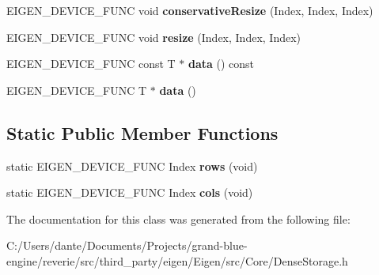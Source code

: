 \begin{DoxyCompactItemize}
\item 
\mbox{\label{class_eigen_1_1_dense_storage_aaca3c8de8c76bfc7f7c4856c0faae7b3}} 
E\+I\+G\+E\+N\+\_\+\+D\+E\+V\+I\+C\+E\+\_\+\+F\+U\+NC void {\bfseries conservative\+Resize} (Index, Index, Index)
\item 
\mbox{\label{class_eigen_1_1_dense_storage_a22518a835225a3464a2b12396f13a12c}} 
E\+I\+G\+E\+N\+\_\+\+D\+E\+V\+I\+C\+E\+\_\+\+F\+U\+NC void {\bfseries resize} (Index, Index, Index)
\item 
\mbox{\label{class_eigen_1_1_dense_storage_a5b5984857e0f9091125bc75acc6f770f}} 
E\+I\+G\+E\+N\+\_\+\+D\+E\+V\+I\+C\+E\+\_\+\+F\+U\+NC const T $\ast$ {\bfseries data} () const
\item 
\mbox{\label{class_eigen_1_1_dense_storage_a640d283f082751670f766a6f4ace1867}} 
E\+I\+G\+E\+N\+\_\+\+D\+E\+V\+I\+C\+E\+\_\+\+F\+U\+NC T $\ast$ {\bfseries data} ()
\end{DoxyCompactItemize}
\subsection*{Static Public Member Functions}
\begin{DoxyCompactItemize}
\item 
\mbox{\label{class_eigen_1_1_dense_storage_a14b68f709f5fb46eeebb203266cc29b2}} 
static E\+I\+G\+E\+N\+\_\+\+D\+E\+V\+I\+C\+E\+\_\+\+F\+U\+NC Index {\bfseries rows} (void)
\item 
\mbox{\label{class_eigen_1_1_dense_storage_aef23781f9dc545e8b3f6b75d6c05d777}} 
static E\+I\+G\+E\+N\+\_\+\+D\+E\+V\+I\+C\+E\+\_\+\+F\+U\+NC Index {\bfseries cols} (void)
\end{DoxyCompactItemize}


The documentation for this class was generated from the following file\+:\begin{DoxyCompactItemize}
\item 
C\+:/\+Users/dante/\+Documents/\+Projects/grand-\/blue-\/engine/reverie/src/third\+\_\+party/eigen/\+Eigen/src/\+Core/Dense\+Storage.\+h\end{DoxyCompactItemize}
